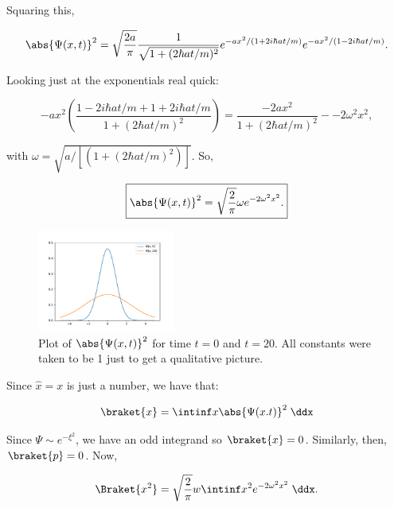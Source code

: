 \begin{parts}
\item Squaring this,

\begin{equation*}
    \abs{\Psi(x,t)}^2 = \sqrt{\frac{2a}{\pi}} \frac{1}{\sqrt{1+(2\hbar at/m)^2}} e^{-ax^2/(1 + 2i\hbar at/m)}e^{-ax^2/(1 - 2i\hbar at/m)}.
\end{equation*}

Looking just at the exponentials real quick:

\begin{equation*}
    -ax^2 \left( \frac{1-2i\hbar at/m + 1+2i\hbar at/m}{1 + (2\hbar at/m)^2} \right) = \frac{-2ax^2}{1 + (2\hbar at/m)^2} - -2\omega^2x^2,
\end{equation*}

with $\omega = \sqrt{a/[(1+(2\hbar at/m)^2)]}$. So,

\begin{equation*}
    \boxed{\abs{\Psi(x,t)}^2 = \sqrt{\frac{2}{\pi}} \omega e^{-2\omega^2x^2}.}
\end{equation*}

\begin{figure}[ht]
    \centering
    \includegraphics[width=0.4\textwidth]{./res/Prblm4.pdf}
    \caption{Plot of $\abs{\Psi(x,t)}^2$ for time $t=0$ and $t=20$. All constants were taken to be 1 just to get a qualitative picture.}
    \label{fig:Prblm4PsiSquared}
\end{figure}

 



\item Since $\hat{x} = x$ is just a number, we have that:

\begin{equation*}
    \braket{x} = \intinf x \abs{\Psi(x.t)}^2 \;\ddx
\end{equation*}

Since $\Psi \sim e^{-\xi^2}$, we have an odd integrand so $\braket{x}=0$. Similarly, then, $\braket{p} = 0$. Now,

\begin{equation*}
    \Braket{x^2} = \sqrt{\frac{2}{\pi}}w \intinf x^2 e^{-2\omega^2x^2}\;\ddx.
\end{equation*}


\end{parts}
